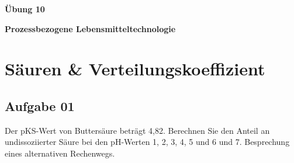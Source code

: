 \documentclass[a4paper,11pt]{article}
\begin{document}


\bckgrnd


\begin{center}
\LARGE
\color{white}
\textbf{Übung 10} \par \vspace*{2mm}
\large \color{miugray} \textbf{Prozessbezogene Lebensmitteltechnologie}
\end{center}
\par 
\vspace*{6mm}


\color{miudiutex}
\section*{Säuren \& Verteilungskoeffizient}


\subsection*{Aufgabe 01}
Der pKS-Wert von Buttersäure beträgt 4,82. Berechnen Sie den Anteil an undissoziierter Säure
bei den pH-Werten 1, 2, 3, 4, 5 und 6 und 7. Besprechung eines alternativen Rechenwegs.
\end{document}
